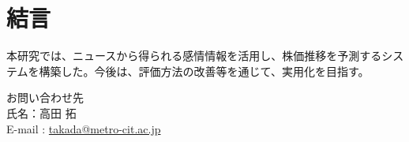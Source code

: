 \documentclass[a4paper, 10pt]{article}
\begin{document}
\section{結言}

本研究では、ニュースから得られる感情情報を活用し、株価推移を予測するシステムを構築した。今後は、評価方法の改善等を通じて、実用化を目指す。

\noindent
{}

お問い合わせ先\\
氏名：高田 拓 \\
E-mail : \href{mailto:takada@metro-cit.ac.jp}{takada@metro-cit.ac.jp}
\end{document}
